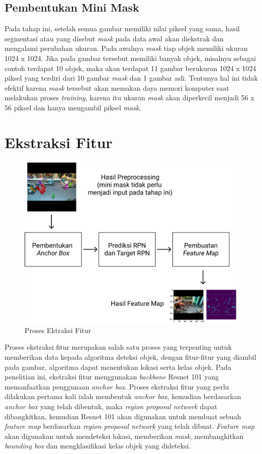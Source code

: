 \subsection{Pembentukan Mini Mask}
Pada tahap ini, setelah semua gambar memiliki nilai piksel yang sama, hasil segmentasi atau yang disebut
\textit{mask} pada data awal akan diekstrak dan mengalami perubahan ukuran. Pada awalnya \textit{mask} tiap objek
memiliki ukuran 1024 x 1024. Jika pada gambar tersebut memiliki banyak objek, misalnya sebagai contoh terdapat 10
objek, maka akan terdapat 11 gambar berukuran 1024 x 1024 piksel yang terdiri dari 10 gambar \textit{mask} dan 
1 gambar asli. Tentunya hal ini tidak efektif karena \textit{mask} tersebut akan memakan daya memori komputer 
saat melakukan proses \textit{training}, karena itu ukuran \textit{mask} akan diperkecil menjadi 56 x 56 piksel
dan hanya mengambil piksel \textit{mask}.

\section{Ekstraksi Fitur}

\begin{figure}[h!]
  \begin{center}
    \includegraphics[width= 0.7\linewidth]{bab3/Ekstraksi Fitur.png}
    \caption{Proses Ektraksi Fitur}
    \label{fig: ekstraksi_fitur}
  \end{center}
\end{figure}

Proses ekstraksi fitur merupakan salah satu proses yang terpenting untuk memberikan data kepada algoritma deteksi
objek, dengan fitur-fitur yang diambil pada gambar, algoritma dapat menentukan lokasi serta kelas objek. Pada
penelitian ini, ekstraksi fitur menggunakan \textit{backbone} Resnet 101 yang memanfaatkan penggunaan 
\textit{anchor box}. Proses ekstraksi fitur yang perlu dilakukan pertama kali ialah membentuk \textit{anchor box},
kemudian berdasarkan \textit{anchor box} yang telah dibentuk, maka \textit{region proposal network} dapat dibangkitkan,
kemudian Resnet 101 akan digunakan untuk membuat sebuah \textit{feature map} berdasarkan \textit{region proposal
network} yang telah dibuat. \textit{Feature map} akan digunakan untuk mendeteksi lokasi, memberikan \textit{mask},
membangkitkan \textit{bounding box} dan mengklasifikasi kelas objek yang dideteksi.

